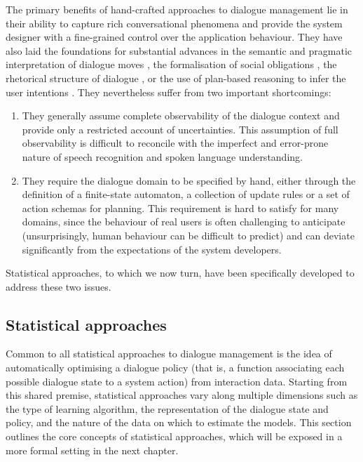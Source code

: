 The primary benefits of hand-crafted approaches to dialogue management lie in their ability to capture rich conversational phenomena and provide the system designer with a fine-grained control over the application behaviour.  They have also laid the foundations for substantial advances in the semantic and pragmatic interpretation of dialogue moves \citep{ThomasonManuscript-THOEUA,Ginzburg2012}, the formalisation of social obligations \citep{Traum:1994}, the rhetorical structure of dialogue \citep{0521659515}, or the use of plan-based reasoning to infer the user intentions \citep{Allen1980,Litman87}.  They nevertheless suffer from two important shortcomings: \begin{enumerate}
\item They generally assume complete observability of the dialogue context and provide only a restricted account of uncertainties. This assumption of full observability is difficult to reconcile with the imperfect and error-prone nature of speech recognition and spoken language understanding.

\item They require the dialogue domain to be specified by hand, either through the definition of a finite-state automaton, a collection of update rules or a set of action schemas for planning.  This requirement is hard to satisfy for many domains, since the behaviour of real users is often challenging to anticipate (unsurprisingly, human behaviour can be difficult to predict) and can deviate significantly from the expectations of the system developers. 
\end{enumerate}

Statistical approaches, to which we now turn, have been specifically developed to address these two issues.

\subsection{Statistical approaches}
\label{sec:statistical}

Common to all statistical approaches to dialogue management is the idea of automatically optimising a dialogue policy (that is, a function associating each possible dialogue state to a system action) from interaction data.  Starting from this shared premise, statistical approaches vary along multiple dimensions such as the type of learning algorithm, the representation of the dialogue state and policy, and the nature of the data on which to estimate the models. This section outlines the core concepts of statistical approaches, which will be exposed in a more formal setting in the next chapter. 

